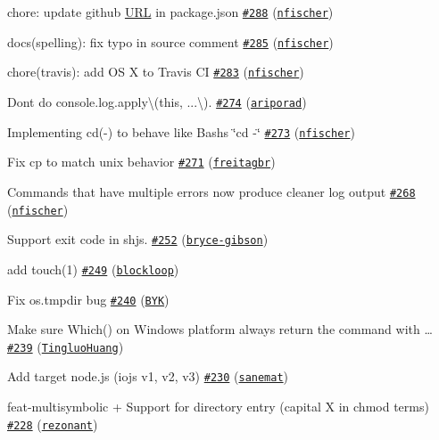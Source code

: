 \begin{DoxyItemize}
\item chore\+: update github \mbox{\hyperlink{namespace_u_r_l}{U\+RL}} in package.\+json \href{https://github.com/shelljs/shelljs/pull/288}{\tt \#288} (\href{https://github.com/nfischer}{\tt nfischer})
\item docs(spelling)\+: fix typo in source comment \href{https://github.com/shelljs/shelljs/pull/285}{\tt \#285} (\href{https://github.com/nfischer}{\tt nfischer})
\item chore(travis)\+: add OS X to Travis CI \href{https://github.com/shelljs/shelljs/pull/283}{\tt \#283} (\href{https://github.com/nfischer}{\tt nfischer})
\item Don\textquotesingle{}t do {\ttfamily console.\+log.\+apply\textbackslash{}(this, ...\textbackslash{})}. \href{https://github.com/shelljs/shelljs/pull/274}{\tt \#274} (\href{https://github.com/ariporad}{\tt ariporad})
\item Implementing cd(\textquotesingle{}-\/\textquotesingle{}) to behave like Bash\textquotesingle{}s \char`\"{}cd -\/\char`\"{} \href{https://github.com/shelljs/shelljs/pull/273}{\tt \#273} (\href{https://github.com/nfischer}{\tt nfischer})
\item Fix cp to match unix behavior \href{https://github.com/shelljs/shelljs/pull/271}{\tt \#271} (\href{https://github.com/freitagbr}{\tt freitagbr})
\item Commands that have multiple errors now produce cleaner log output \href{https://github.com/shelljs/shelljs/pull/268}{\tt \#268} (\href{https://github.com/nfischer}{\tt nfischer})
\item Support exit code in shjs. \href{https://github.com/shelljs/shelljs/pull/252}{\tt \#252} (\href{https://github.com/bryce-gibson}{\tt bryce-\/gibson})
\item add touch(1) \href{https://github.com/shelljs/shelljs/pull/249}{\tt \#249} (\href{https://github.com/blockloop}{\tt blockloop})
\item Fix {\ttfamily os.\+tmpdir} bug \href{https://github.com/shelljs/shelljs/pull/240}{\tt \#240} (\href{https://github.com/BYK}{\tt B\+YK})
\item Make sure Which() on Windows platform always return the command with … \href{https://github.com/shelljs/shelljs/pull/239}{\tt \#239} (\href{https://github.com/TingluoHuang}{\tt Tingluo\+Huang})
\item Add target node.\+js (iojs v1, v2, v3) \href{https://github.com/shelljs/shelljs/pull/230}{\tt \#230} (\href{https://github.com/sanemat}{\tt sanemat})
\item feat-\/multisymbolic + Support for directory entry (capital X in chmod terms) \href{https://github.com/shelljs/shelljs/pull/228}{\tt \#228} (\href{https://github.com/rezonant}{\tt rezonant})

\end{DoxyItemize}
